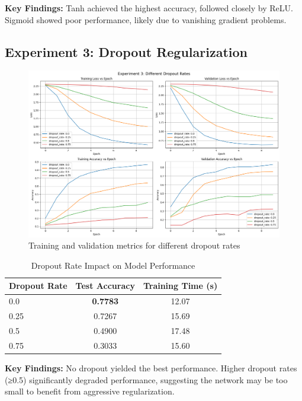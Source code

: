 \documentclass[11pt,a4paper]{article}
\begin{document}
\textbf{Key Findings:} Tanh achieved the highest accuracy, followed closely by ReLU. Sigmoid showed poor performance, likely due to vanishing gradient problems.

\subsection{Experiment 3: Dropout Regularization}
\begin{figure}[H]
\centering
\includegraphics[width=\textwidth]{e3.png}
\caption{Training and validation metrics for different dropout rates}
\label{fig:experiment3}
\end{figure}

\begin{table}[H]
\centering
\caption{Dropout Rate Impact on Model Performance}
\begin{tabular}{@{}lcc@{}}
\toprule
\textbf{Dropout Rate} & \textbf{Test Accuracy} & \textbf{Training Time (s)} \\
\midrule
0.0 & \textbf{0.7783} & 12.07 \\
0.25 & 0.7267 & 15.69 \\
0.5 & 0.4900 & 17.48 \\
0.75 & 0.3033 & 15.60 \\
\bottomrule
\end{tabular}
\end{table}

\textbf{Key Findings:} No dropout yielded the best performance. Higher dropout rates (≥0.5) significantly degraded performance, suggesting the network may be too small to benefit from aggressive regularization.
\end{document}
